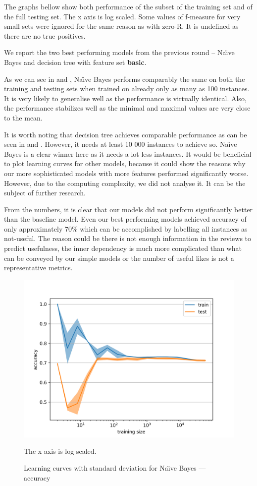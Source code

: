 The graphs bellow show both performance of the subset of the training set and of the full testing set.
The x axis is log scaled.
Some values of f-measure for very small sets were ignored for the same reason as with zero-R.
It is undefined as there are no true positives.

We report the two best performing models from the previous round -- Na\"{\i}ve Bayes and decision tree
with feature set \textbf{basic}.

As we can see in  and , Na\"{\i}ve Bayes performs comparably the same on both the training and testing sets when trained
on already only as many as 100 instances.
It is very likely to generalise well as the performance is virtually identical.
Also, the performance stabilizes well as the minimal and maximal values are very close to the mean.

It is worth noting that decision tree achieves comparable performance as can be seen in
 and .
However, it needs at least 10 000 instances to achieve so.
Na\"{\i}ve Bayes is a clear winner here as it needs a lot less instances.
It would be beneficial to plot learning curves for other models,
because it could show the reasons why our more sophisticated models with
more features performed significantly worse.
However, due to the computing complexity, we did not analyse it.
It can be the subject of further research.

From the numbers, it is clear that our models did not perform significantly better than the baseline model.
Even our best performing models achieved accuracy of only approximately 70\% which can be accomplished by labelling all instances as not-useful.
The reason could be there is not enough information in the reviews to predict
 usefulness, the inner dependency is much more complicated than what can be conveyed by our simple models or the number of useful likes is not a representative metrics.



\begin{figure}[h]\centering
\includegraphics[width=130mm]{figures/lc2_acc.png}
\caption{Learning curves with standard deviation for Na\"{\i}ve Bayes --- accuracy}\label{fig:l_curves2_accuracy}
The x axis is log scaled.
\end{figure}

